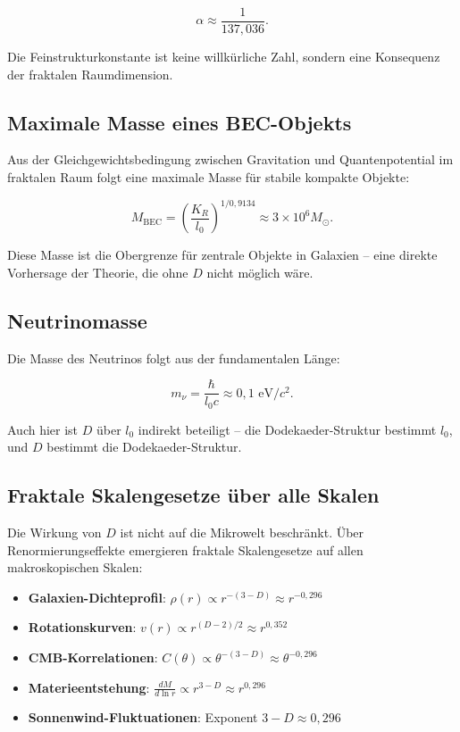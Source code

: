 \documentclass[11pt,a4paper]{article}
\begin{document}
\[
\alpha \approx \frac{1}{137{,}036}.
\]

Die Feinstrukturkonstante ist keine willkürliche Zahl, sondern eine Konsequenz der fraktalen Raumdimension.

\subsection{Maximale Masse eines BEC-Objekts}

Aus der Gleichgewichtsbedingung zwischen Gravitation und Quantenpotential im fraktalen Raum folgt eine maximale Masse für stabile kompakte Objekte:

\[
M_{\text{BEC}} = \left( \frac{K_R}{l_0} \right)^{1/0,9134} \approx 3 \times 10^6 M_\odot.
\]

Diese Masse ist die Obergrenze für zentrale Objekte in Galaxien – eine direkte Vorhersage der Theorie, die ohne \(D\) nicht möglich wäre.

\subsection{Neutrinomasse}

Die Masse des Neutrinos folgt aus der fundamentalen Länge:

\[
m_\nu = \frac{\hbar}{l_0 c} \approx 0{,}1 \text{ eV}/c^2.
\]

Auch hier ist \(D\) über \(l_0\) indirekt beteiligt – die Dodekaeder-Struktur bestimmt \(l_0\), und \(D\) bestimmt die Dodekaeder-Struktur.

\subsection{Fraktale Skalengesetze über alle Skalen}

Die Wirkung von \(D\) ist nicht auf die Mikrowelt beschränkt. Über Renormierungseffekte emergieren fraktale Skalengesetze auf allen makroskopischen Skalen:

\begin{itemize}
    \item \textbf{Galaxien-Dichteprofil}: \(\rho(r) \propto r^{-(3-D)} \approx r^{-0,296}\)
    \item \textbf{Rotationskurven}: \(v(r) \propto r^{(D-2)/2} \approx r^{0,352}\)
    \item \textbf{CMB-Korrelationen}: \(C(\theta) \propto \theta^{-(3-D)} \approx \theta^{-0,296}\)
    \item \textbf{Materieentstehung}: \(\frac{dM}{d\ln r} \propto r^{3-D} \approx r^{0,296}\)
    \item \textbf{Sonnenwind-Fluktuationen}: Exponent \(3-D \approx 0,296\)
\end{itemize}
\end{document}
